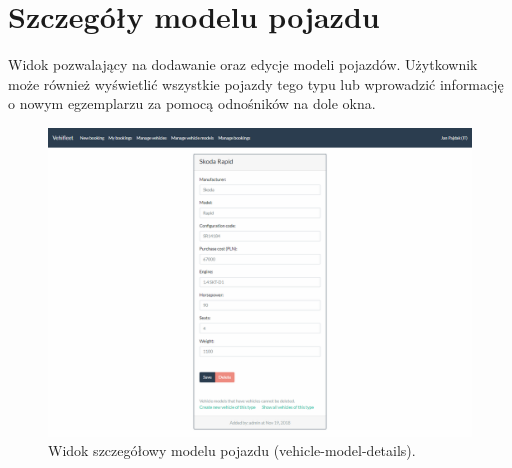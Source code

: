 \documentclass[eng,printmode,openany]{mgr}
\begin{document}
	\section{Szczegóły modelu pojazdu}
	Widok pozwalający na dodawanie oraz edycje modeli pojazdów. Użytkownik może również wyświetlić wszystkie pojazdy tego typu lub wprowadzić informację o nowym egzemplarzu za pomocą odnośników na dole okna.
	\begin{figure}[H]
		\centering
		\includegraphics[width=\textwidth]{images/views/vehicle-model-detail.png}
		\caption{Widok szczegółowy modelu pojazdu (vehicle-model-details).}
	\end{figure}
	
\end{document}
